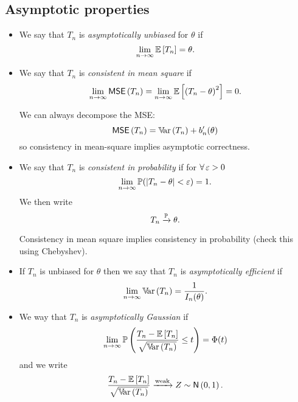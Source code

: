 \documentclass[12pt]{report}
\begin{document}
\subsection{Asymptotic properties}
\begin{definition}
	\begin{itemize}
	\item 	We say that $T_{n}$ is \emph{asymptotically unbiased} for $\theta$ if
	\begin{equation*}
		\lim_{n\to\infty}\mathbb{E}\left[T_{n}\right]=\theta.
	\end{equation*}
	\item We say that $T_{n}$ is \emph{consistent in mean square} if
	\begin{equation*}
		\lim_{n\to\infty} \mathsf{MSE}\left(T_{n}\right)=\lim_{n\to\infty}\mathbb{E}\left[\left(T_{n}-\theta\right)^{2}\right]=0.
	\end{equation*}
	\begin{remark}
		We can always decompose the MSE:
		\begin{equation*}
			\mathsf{MSE}\left(T_{n}\right)=\mathbb{V}\!\mathrm{ar}\,(T_{n})+b'_{n}(\theta)
		\end{equation*}
		so consistency in mean-square implies asymptotic correctness.
	\end{remark}
	\item We say that $T_{n}$ is \emph{consistent in probability} if for $\forall\,\varepsilon>0$
	\begin{equation*}
		\lim_{n\to\infty}\mathbb{P}(|T_{n}-\theta|<\varepsilon)=1.
	\end{equation*}
	We then write 
	\begin{equation*}
		T_{n}\xrightarrow[]{\mathbb{P}}\theta.
	\end{equation*}
	\begin{remark}
		Consistency in mean square implies consistency in probability (check this using Chebyshev).
	\end{remark}
	\item If $T_{n}$ is unbiased for $\theta$ then we say that $T_{n}$ is \emph{asymptotically efficient} if 
	\begin{equation*}
		\lim_{n\to\infty}\mathbb{V}\!\mathrm{ar}\,(T_{n})=\frac{1}{I_{n}(\theta)}.
	\end{equation*}
	\item We way that $T_{n}$ is \emph{asymptotically Gaussian} if\\
	\begin{equation*}
		\lim_{n\to\infty}\mathbb{P}\left(\frac{T_{n}-\mathbb{E}\left[T_{n}\right]}{\sqrt{\mathbb{V}\!\mathrm{ar}\,(T_{n})}}\leq t\right)=\Phi(t)
	\end{equation*}
	and we write
	\begin{equation*}
		\frac{T_{n}-\mathbb{E}\left[T_{n}\right]}{\sqrt{\mathbb{V}\!\mathrm{ar}\,(T_{n})}}\xrightarrow[]{\mathrm{weak}} Z\sim\mathsf{N}\left(0,1\right).
	\end{equation*}
	\end{itemize}
\end{definition}
\end{document}
